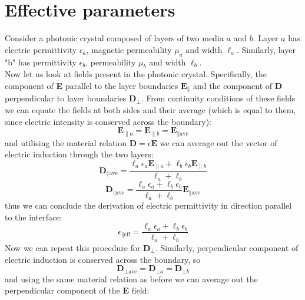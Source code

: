 \documentclass[a4paper]{scrartcl}
\begin{document}
\section{Effective parameters}
Consider a photonic crystal composed of layers of two media $a$ and $b$. Layer $a$ has electric permittivity
$\epsilon_{a}$, magnetic permeability $\mu_{a}$ and width $\ell_{a}$. Similarly, layer "b" has permittivity
$\epsilon_{b}$, permeability $\mu_{b}$ and width $\ell_{b}$.
\\
Now let us look at fields present in the photonic crystal. Specifically, the component of \textbf{E} parallel to the
layer boundaries $\mathbf{E_\parallel}$ and the component of \textbf{D} perpendicular to layer boundaries
$\mathbf{D_\bot}$. From continuity conditions of these
fields we can equate the fields at both sides and their average (which is equal to them, since electric intensity is
conserved across the boundary):
\begin{equation}
      \mathbf{E}_{\parallel a} = \mathbf{E}_{\parallel b } = \mathbf{E}_{\parallel \textrm{ave} }
\end{equation}
and utilising the material relation $\mathbf{D}=\epsilon \mathbf{E}$ we can average out the vector of electric induction
through the two layers:
\begin{equation}
      \mathbf{D}_{\parallel \textrm{ave} } = \frac{\ell_{a } \epsilon_{a } \mathbf{E}_{\parallel
            a } + \ell_{b } \epsilon_{ b }
\mathbf{E}_{\parallel b} }{\ell_{a} + \ell_{b}}
\end{equation}
\begin{equation}
      \mathbf{D}_{\parallel \textrm{ave} } = \frac{\ell_{a } \epsilon_{a } + \ell_{b }
      \epsilon_{b } }{\ell_{a } + \ell_{b }}
      \mathbf{E}_{\parallel \textrm{ave} }
\end{equation}
thus we can conclude the derivation of electric permittivity in direction parallel to the interface:
\begin{equation}
      \epsilon_{\parallel \textrm{eff} } = \frac{\ell_a \epsilon_a + \ell_b
      \epsilon_b}{\ell_a + \ell_b }
\end{equation}
Now we can repeat this procedure for $\mathbf{D}_\bot$. Similarly, perpendicular component of electric induction is
conserved across the boundary, so
\begin{equation}
      \mathbf{D}_{\bot \textrm{ave} } = \mathbf{D}_{\bot a } = \mathbf{D}_{\bot b }
\end{equation}
and using the same material relation as before we can average out the perpendicular component of the \textbf{E} field:
\end{document}
